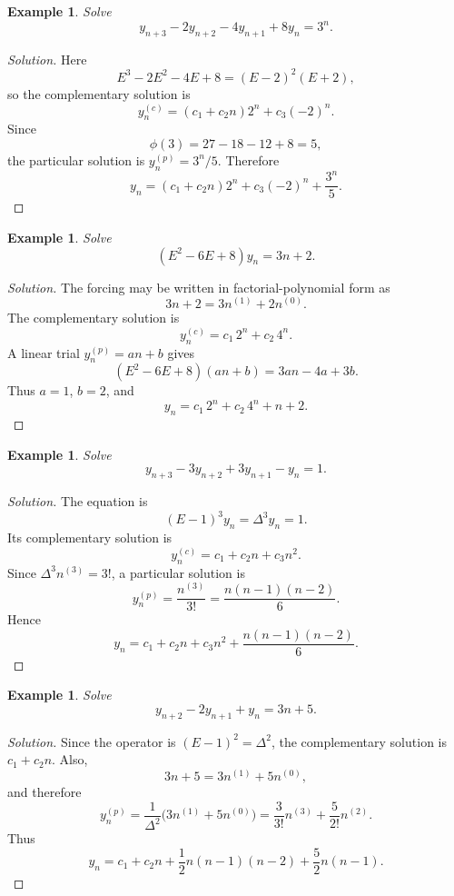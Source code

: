 \documentclass[11pt,a4paper]{article}
\numberwithin{equation}{section}
\theoremstyle{spacedplain}
\theoremstyle{spaceddefinition}
\newtheorem{example}[theorem]{Example}
\theoremstyle{spacedremark}
\begin{document}
\begin{example}
Solve
\[
  y_{n+3}-2y_{n+2}-4y_{n+1}+8y_n=3^n.
\]
\end{example}

\begin{proof}[Solution]
Here
\[
  E^3-2E^2-4E+8=(E-2)^2(E+2),
\]
so the complementary solution is
\[
  y_n^{(c)}=(c_1+c_2n)2^n+c_3(-2)^n.
\]
Since
\[
  \phi(3)=27-18-12+8=5,
\]
the particular solution is \(y_n^{(p)}=3^n/5\).  Therefore
\[
  \boxed{
  y_n=(c_1+c_2n)2^n+c_3(-2)^n+\frac{3^n}{5}.}
\]
\end{proof}

\begin{example}
Solve
\[
  (E^2-6E+8)y_n=3n+2.
\]
\end{example}

\begin{proof}[Solution]
The forcing may be written in factorial-polynomial form as
\[
  3n+2=3n^{(1)}+2n^{(0)}.
\]
The complementary solution is
\[
  y_n^{(c)}=c_1\,2^n+c_2\,4^n.
\]
A linear trial \(y_n^{(p)}=an+b\) gives
\[
  (E^2-6E+8)(an+b)=3an-4a+3b.
\]
Thus \(a=1\), \(b=2\), and
\[
  \boxed{y_n=c_1\,2^n+c_2\,4^n+n+2.}
\]
\end{proof}

\begin{example}
Solve
\[
  y_{n+3}-3y_{n+2}+3y_{n+1}-y_n=1.
\]
\end{example}

\begin{proof}[Solution]
The equation is
\[
  (E-1)^3y_n=\Delta^3y_n=1.
\]
Its complementary solution is
\[
  y_n^{(c)}=c_1+c_2n+c_3n^2.
\]
Since \(\Delta^3n^{(3)}=3!\), a particular solution is
\[
  y_n^{(p)}=\frac{n^{(3)}}{3!}
  =\frac{n(n-1)(n-2)}{6}.
\]
Hence
\[
  \boxed{
  y_n=c_1+c_2n+c_3n^2+\frac{n(n-1)(n-2)}{6}.}
\]
\end{proof}

\begin{example}
Solve
\[
  y_{n+2}-2y_{n+1}+y_n=3n+5.
\]
\end{example}

\begin{proof}[Solution]
Since the operator is \((E-1)^2=\Delta^2\), the complementary solution
is \(c_1+c_2n\).  Also,
\[
  3n+5=3n^{(1)}+5n^{(0)},
\]
and therefore
\[
  y_n^{(p)}
  =\frac{1}{\Delta^2}
    \bigl(3n^{(1)}+5n^{(0)}\bigr)
  =\frac{3}{3!}n^{(3)}+\frac{5}{2!}n^{(2)}.
\]
Thus
\[
  \boxed{
  y_n=c_1+c_2n
  +\frac12n(n-1)(n-2)
  +\frac52n(n-1).}
\]
\end{proof}
\end{document}
